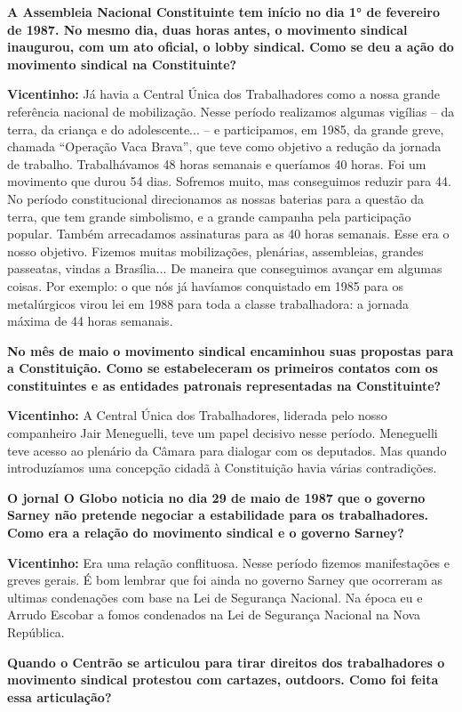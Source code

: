 \textbf{A Assembleia Nacional Constituinte tem início no dia 1° de
fevereiro de 1987. No mesmo dia, duas horas antes, o movimento sindical
inaugurou, com um ato oficial, o lobby sindical. Como se deu a ação do
movimento sindical na Constituinte?}

\textbf{Vicentinho:} Já havia a Central Única dos Trabalhadores como a
nossa grande referência nacional de mobilização. Nesse período
realizamos algumas vigílias -- da terra, da criança e do adolescente...
-- e participamos, em 1985, da grande greve, chamada ``Operação Vaca
Brava'', que teve como objetivo a redução da jornada de trabalho.
Trabalhávamos 48 horas semanais e queríamos 40 horas. Foi um movimento
que durou 54 dias. Sofremos muito, mas conseguimos reduzir para 44. No
período constitucional direcionamos as nossas baterias para a questão da
terra, que tem grande simbolismo, e a grande campanha pela participação
popular. Também arrecadamos assinaturas para as 40 horas semanais. Esse
era o nosso objetivo. Fizemos muitas mobilizações, plenárias,
assembleias, grandes passeatas, vindas a Brasília... De maneira que
conseguimos avançar em algumas coisas. Por exemplo: o que nós já
havíamos conquistado em 1985 para os metalúrgicos virou lei em 1988 para
toda a classe trabalhadora: a jornada máxima de 44 horas semanais.

\textbf{No mês de maio o movimento sindical encaminhou suas propostas
para a Constituição. Como se estabeleceram os primeiros contatos com os
constituintes e as entidades patronais representadas na Constituinte?}

\textbf{Vicentinho:} A Central Única dos Trabalhadores, liderada pelo
nosso companheiro Jair Meneguelli, teve um papel decisivo nesse período.
Meneguelli teve acesso ao plenário da Câmara para dialogar com os
deputados. Mas quando introduzíamos uma concepção cidadã à Constituição
havia várias contradições.

\textbf{O jornal O Globo noticia no dia 29 de maio de 1987 que o governo
Sarney não pretende negociar a estabilidade para os trabalhadores.}
\textbf{Como era a relação do movimento sindical e o governo Sarney?}

\textbf{Vicentinho:} Era uma relação conflituosa. Nesse período fizemos
manifestações e greves gerais. É bom lembrar que foi ainda no governo
Sarney que ocorreram as ultimas condenações com base na Lei de Segurança
Nacional. Na época eu e Arrudo Escobar a fomos condenados na Lei de
Segurança Nacional na Nova República.

\textbf{Quando o Centrão se articulou para tirar direitos dos
trabalhadores o movimento sindical protestou com cartazes, outdoors.
Como foi feita essa articulação?}

